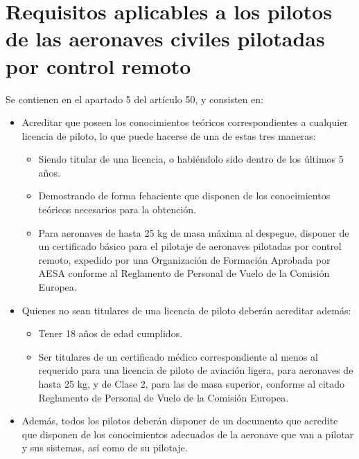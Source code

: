 \clearpage

\section{Requisitos aplicables a los pilotos de las aeronaves civiles pilotadas por control remoto}

Se contienen en el apartado 5 del artículo 50, y consisten en:

\begin{itemize}
\item Acreditar que poseen los conocimientos teóricos correspondientes a cualquier licencia de piloto, lo que puede hacerse de una de estas tres maneras:
	\begin{itemize}
	\item Siendo titular de una licencia, o habiéndolo sido dentro de los últimos 5 años.
	\item Demostrando de forma fehaciente que disponen de los conocimientos teóricos necesarios para la obtención.
	\item Para aeronaves de hasta 25 kg de masa máxima al despegue, disponer de un certificado básico para el pilotaje de aeronaves pilotadas por control remoto, expedido por una Organización de Formación Aprobada por AESA conforme al Reglamento de Personal de Vuelo de la Comisión Europea.
	\end{itemize}
\item Quienes no sean titulares de una licencia de piloto deberán acreditar además:
	\begin{itemize}
	\item Tener 18 años de edad cumplidos.
	\item Ser titulares de un certificado médico correspondiente al menos al requerido para una licencia de piloto de aviación ligera, para aeronaves de hasta 25 kg, y de Clase 2, para las de masa superior, conforme al citado Reglamento de Personal de Vuelo de la Comisión Europea.
	\end{itemize}
\item Además, todos los pilotos deberán disponer de un documento que acredite que disponen de los conocimientos adecuados de la aeronave que van a pilotar y sus sistemas, así como de su pilotaje.
\end{itemize}

